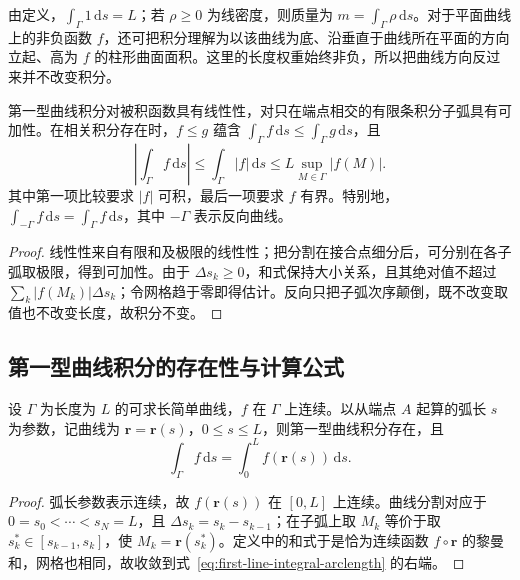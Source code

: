 \documentclass[UTF8,12pt,a4paper,fontset=fandol]{ctexbook}
\begin{document}
由定义，$\int_\Gamma1\,\mathrm ds=L$；若 $\rho\geq0$ 为线密度，则质量为 $m=\int_\Gamma\rho\,\mathrm ds$。对于平面曲线上的非负函数 $f$，还可把积分理解为以该曲线为底、沿垂直于曲线所在平面的方向立起、高为 $f$ 的柱形曲面面积。这里的长度权重始终非负，所以把曲线方向反过来并不改变积分。

\begin{proposition}
\label{prop:first-line-integral-properties}
第一型曲线积分对被积函数具有线性性，对只在端点相交的有限条积分子弧具有可加性。在相关积分存在时，$f\leq g$ 蕴含 $\int_\Gamma f\,\mathrm ds\leq\int_\Gamma g\,\mathrm ds$，且
\[
    \left|\int_\Gamma f\,\mathrm ds\right|
    \leq\int_\Gamma|f|\,\mathrm ds
    \leq L\sup_{M\in\Gamma}|f(M)|.
\]
其中第一项比较要求 $|f|$ 可积，最后一项要求 $f$ 有界。特别地，$\int_{-\Gamma}f\,\mathrm ds=\int_\Gamma f\,\mathrm ds$，其中 $-\Gamma$ 表示反向曲线。
\end{proposition}

\begin{proof}
线性性来自有限和及极限的线性性；把分割在接合点细分后，可分别在各子弧取极限，得到可加性。由于 $\Delta s_k\geq0$，和式保持大小关系，且其绝对值不超过 $\sum_k|f(M_k)|\Delta s_k$；令网格趋于零即得估计。反向只把子弧次序颠倒，既不改变取值也不改变长度，故积分不变。
\end{proof}

\subsection{第一型曲线积分的存在性与计算公式}
\label{subsec:existence-and-evaluation-of-line-integrals-of-the-first-kind}

\begin{theorem}
\label{thm:first-line-integral-arclength}
设 $\Gamma$ 为长度为 $L$ 的可求长简单曲线，$f$ 在 $\Gamma$ 上连续。以从端点 $A$ 起算的弧长 $s$ 为参数，记曲线为 $\boldsymbol r=\boldsymbol r(s)$，$0\leq s\leq L$，则第一型曲线积分存在，且
\begin{equation}
\label{eq:first-line-integral-arclength}
    \int_\Gamma f\,\mathrm ds=\int_0^L f(\boldsymbol r(s))\,\mathrm ds.
\end{equation}
\end{theorem}

\begin{proof}
弧长参数表示连续，故 $f(\boldsymbol r(s))$ 在 $[0,L]$ 上连续。曲线分割对应于 $0=s_0<\cdots<s_N=L$，且 $\Delta s_k=s_k-s_{k-1}$；在子弧上取 $M_k$ 等价于取 $s_k^*\in[s_{k-1},s_k]$，使 $M_k=\boldsymbol r(s_k^*)$。定义中的和式于是恰为连续函数 $f\circ\boldsymbol r$ 的黎曼和，网格也相同，故收敛到式~\eqref{eq:first-line-integral-arclength} 的右端。
\end{proof}
\end{document}
